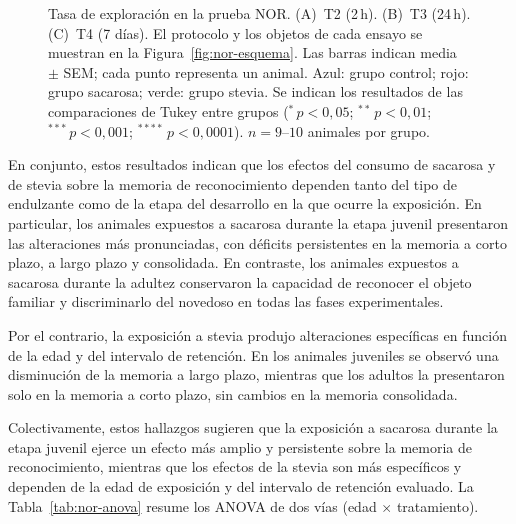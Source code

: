 \begin{figure}[htbp]
  \centering
  \caption[Tasa de exploración en la prueba NOR]{Tasa de exploración en la prueba NOR. (A)~T2 (2\,h). (B)~T3 (24\,h). (C)~T4 (7 días). El protocolo y los objetos de cada ensayo se muestran en la Figura~\ref{fig:nor-esquema}. Las barras indican media $\pm$ SEM; cada punto representa un animal. Azul: grupo control; rojo: grupo sacarosa; verde: grupo stevia. Se indican los resultados de las comparaciones de Tukey entre grupos ($^{*}\,p < 0{,}05$; $^{**}\,p < 0{,}01$; $^{***}\,p < 0{,}001$; $^{****}\,p < 0{,}0001$). $n = 9$--$10$ animales por grupo.}
  \label{fig:nor-tasa}
\end{figure}

En conjunto, estos resultados indican que los efectos del consumo de sacarosa y de stevia sobre la memoria de reconocimiento dependen tanto del tipo de endulzante como de la etapa del desarrollo en la que ocurre la exposición. En particular, los animales expuestos a sacarosa durante la etapa juvenil presentaron las alteraciones más pronunciadas, con déficits persistentes en la memoria a corto plazo, a largo plazo y consolidada. En contraste, los animales expuestos a sacarosa durante la adultez conservaron la capacidad de reconocer el objeto familiar y discriminarlo del novedoso en todas las fases experimentales.

Por el contrario, la exposición a stevia produjo alteraciones específicas en función de la edad y del intervalo de retención. En los animales juveniles se observó una disminución de la memoria a largo plazo, mientras que los adultos la presentaron solo en la memoria a corto plazo, sin cambios en la memoria consolidada.

Colectivamente, estos hallazgos sugieren que la exposición a sacarosa durante la etapa juvenil ejerce un efecto más amplio y persistente sobre la memoria de reconocimiento, mientras que los efectos de la stevia son más específicos y dependen de la edad de exposición y del intervalo de retención evaluado. La Tabla~\ref{tab:nor-anova} resume los ANOVA de dos vías (edad $\times$ tratamiento).


